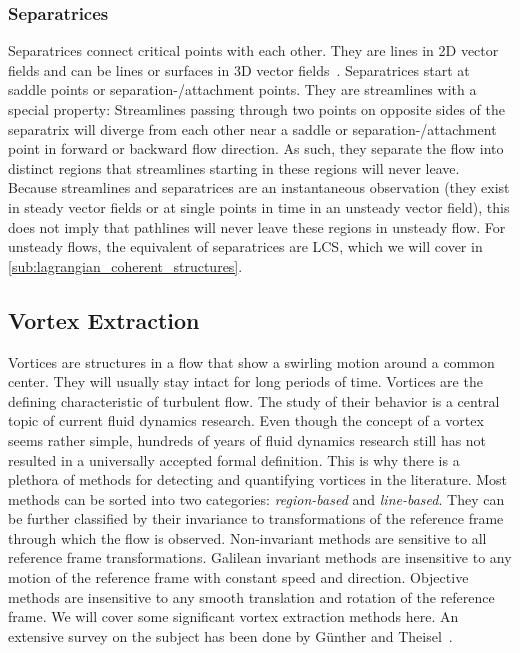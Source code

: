 \subsubsection{Separatrices} %
\label{ssub:separatrices}
%
Separatrices connect critical points with each other.
%
They are lines in \ac{2D} vector fields and can be lines or surfaces in \ac{3D}
vector fields~\cite{Helman1989,Helman1991}.
%
Separatrices start at saddle points or separation-/attachment points.
%
They are streamlines with a special property: Streamlines passing through two
points on opposite sides of the separatrix will diverge from each other near a
saddle or separation-/attachment point in forward or backward flow direction.
%
As such, they separate the flow into distinct regions that streamlines starting
in these regions will never leave.
%
Because streamlines and separatrices are an instantaneous observation (they
exist in steady vector fields or at single points in time in an unsteady vector
field), this does not imply that pathlines will never leave these regions in
unsteady flow.
%
For unsteady flows, the equivalent of separatrices are \acl{LCS}, which we will
cover in \cref{sub:lagrangian_coherent_structures}.
%
%
%
\subsection{Vortex Extraction} %
\label{sub:vortex_extraction}
%
Vortices are structures in a flow that show a swirling motion around a common
center.
%
They will usually stay intact for long periods of time.
%
Vortices are the defining characteristic of turbulent flow.
%
The study of their behavior is a central topic of current fluid dynamics
research.
%
Even though the concept of a vortex seems rather simple, hundreds of years of
fluid dynamics research still has not resulted in a universally accepted formal
definition.
%
This is why there is a plethora of methods for detecting and quantifying
vortices in the literature.
%
Most methods can be sorted into two categories: \emph{region-based} and
\emph{line-based}.
%
They can be further classified by their invariance to transformations of the
reference frame through which the flow is observed.
%
Non-invariant methods are sensitive to all reference frame transformations.
%
Galilean invariant methods are insensitive to any motion of the reference frame
with constant speed and direction.
%
Objective methods are insensitive to any smooth translation and rotation of the
reference frame.
%
We will cover some significant vortex extraction methods here.
%
An extensive survey on the subject has been done by G\"unther and
Theisel~\cite{Guenther2018}.
%

